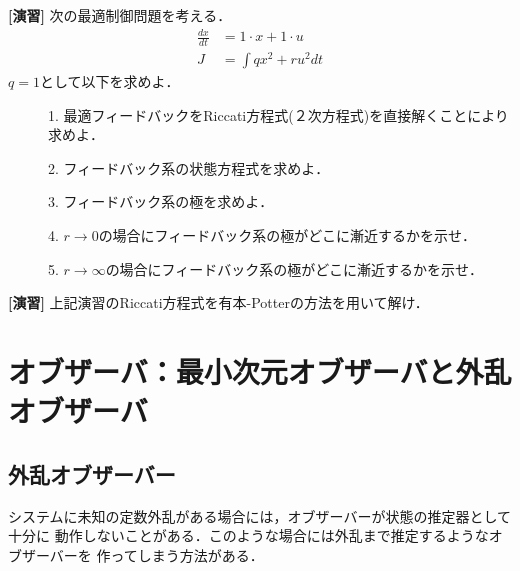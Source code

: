 \noindent
{\bf [演習]}\nopagebreak
次の最適制御問題を考える．
\begin{align}
	\frac{dx}{dt} & = 1 \cdot x + 1 \cdot u
\nonumber \\
	J &= \int q x^2 + r u^2 dt
\end{align}
$q=1$として以下を求めよ．
\begin{description}
  \item[] 1. 最適フィードバックをRiccati方程式(２次方程式)を直接解くことにより求めよ．
  \item[] 2. フィードバック系の状態方程式を求めよ．
  \item[] 3. フィードバック系の極を求めよ．
  \item[] 4. $r \rightarrow 0$の場合にフィードバック系の極がどこに漸近するかを示せ．
  \item[] 5. $r \rightarrow \infty$の場合にフィードバック系の極がどこに漸近するかを示せ．
\end{description}

\noindent
{\bf [演習]}\nopagebreak
上記演習のRiccati方程式を有本-Potterの方法を用いて解け．


\section{オブザーバ：最小次元オブザーバと外乱オブザーバ}



\subsection{外乱オブザーバー}
システムに未知の定数外乱がある場合には，オブザーバーが状態の推定器として十分に
動作しないことがある．このような場合には外乱まで推定するようなオブザーバーを
作ってしまう方法がある．

